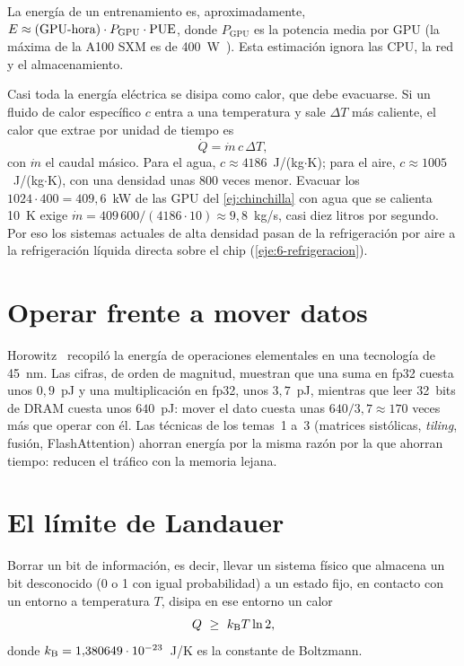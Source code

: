 La energía de un entrenamiento es, aproximadamente, $E\approx(\text{GPU-hora})\cdot P_{\mathrm{GPU}}\cdot\mathrm{PUE}$, donde $P_{\mathrm{GPU}}$ es la potencia media por GPU (la máxima de la A100 SXM es de 400~W~\cite{a100}). Esta estimación ignora las CPU, la red y el almacenamiento.

Casi toda la energía eléctrica se disipa como calor, que debe evacuarse. Si un fluido de calor específico $c$ entra a una temperatura y sale $\Delta T$ más caliente, el calor que extrae por unidad de tiempo es
\[
\dot{Q}=\dot{m}\,c\,\Delta T,
\]
con $\dot{m}$ el caudal másico. Para el agua, $c\approx 4186$~J/(kg$\cdot$K); para el aire, $c\approx 1005$~J/(kg$\cdot$K), con una densidad unas 800 veces menor. Evacuar los $1024\cdot 400=409{,}6$~kW de las GPU del \cref{ej:chinchilla} con agua que se calienta 10~K exige $\dot{m}=409\,600/(4186\cdot 10)\approx 9{,}8$~kg/s, casi diez litros por segundo. Por eso los sistemas actuales de alta densidad pasan de la refrigeración por aire a la refrigeración líquida directa sobre el chip (\cref{eje:6-refrigeracion}).

\section{Operar frente a mover datos}

Horowitz~\cite{horowitz} recopiló la energía de operaciones elementales en una tecnología de 45~nm. Las cifras, de orden de magnitud, muestran que una suma en fp32 cuesta unos $0{,}9$~pJ y una multiplicación en fp32, unos $3{,}7$~pJ, mientras que leer 32~bits de DRAM cuesta unos $640$~pJ: mover el dato cuesta unas $640/3{,}7\approx 170$ veces más que operar con él. Las técnicas de los temas~1 a~3 (matrices sistólicas, \emph{tiling}, fusión, FlashAttention) ahorran energía por la misma razón por la que ahorran tiempo: reducen el tráfico con la memoria lejana.

\addtocounter{definicion}{1}%

\section{El límite de Landauer}

\begin{teorema}\label{teo:landauer}
Borrar un bit de información, es decir, llevar un sistema físico que almacena un bit desconocido (0 o 1 con igual probabilidad) a un estado fijo, en contacto con un entorno a temperatura $T$, disipa en ese entorno un calor
\[
Q\ \ge\ k_{\mathrm{B}} T\ln 2,
\]
donde $k_{\mathrm{B}}=1{,}380649\cdot 10^{-23}$~J/K es la constante de Boltzmann.
\end{teorema}

